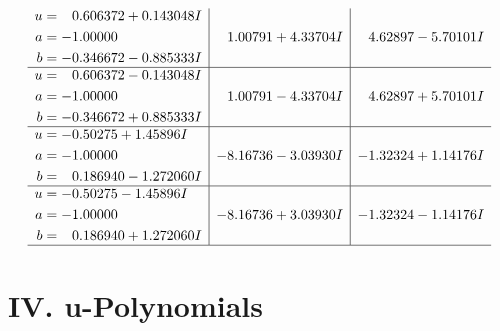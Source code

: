\documentclass[1p]{elsarticle_modified}
\theoremstyle{definition}
\begin{document}
$$\begin{array}{c|c|c}
\begin{aligned}
u &= \phantom{-}0.606372 + 0.143048 I \\
a &= -1.00000\phantom{ +0.000000I} \\
b &= -0.346672 - 0.885333 I\end{aligned}
 & \phantom{-}1.00791 + 4.33704 I & \phantom{-}4.62897 - 5.70101 I \\ \hline\begin{aligned}
u &= \phantom{-}0.606372 - 0.143048 I \\
a &= -1.00000\phantom{ +0.000000I} \\
b &= -0.346672 + 0.885333 I\end{aligned}
 & \phantom{-}1.00791 - 4.33704 I & \phantom{-}4.62897 + 5.70101 I \\ \hline\begin{aligned}
u &= -0.50275 + 1.45896 I \\
a &= -1.00000\phantom{ +0.000000I} \\
b &= \phantom{-}0.186940 - 1.272060 I\end{aligned}
 & -8.16736 - 3.03930 I & -1.32324 + 1.14176 I \\ \hline\begin{aligned}
u &= -0.50275 - 1.45896 I \\
a &= -1.00000\phantom{ +0.000000I} \\
b &= \phantom{-}0.186940 + 1.272060 I\end{aligned}
 & -8.16736 + 3.03930 I & -1.32324 - 1.14176 I\\
 \hline 
 \end{array}$$\newpage
\newpage\renewcommand{\arraystretch}{1}
\centering \section*{ IV. u-Polynomials}
\end{document}
